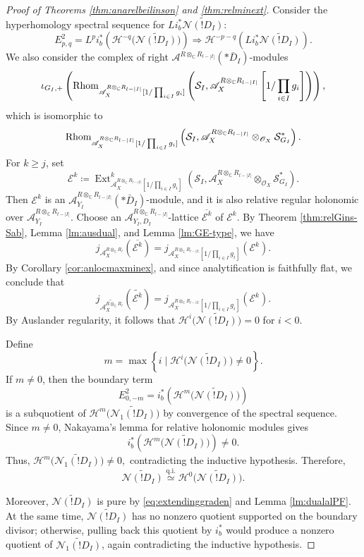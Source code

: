\documentclass{amsart}
\theoremstyle{plain}
\numberwithin{theorem}{section}
\theoremstyle{definition}
\theoremstyle{remark}
\theoremstyle{definition}
\newcommand{\wt}{\widetilde}
\newcommand{\C}{\mathbb{C}} %
\newcommand{\cE}{\mathcal{E}}
\newcommand{\cH}{\mathcal{H}}
\newcommand{\cN}{\mathcal{N}}
\newcommand{\cO}{\mathscr{O}}
\newcommand{\cS}{\mathcal{S}}
\newcommand{\sA}{\mathscr{A}}
\newcommand{\Rhom}{\textup{Rhom}}
\begin{document}
\begin{proof}[Proof of Theorems \ref{thm:anarelbeilinson} and \ref{thm:relminext}]
Consider the hyperhomology spectral sequence for $Li_b^*\wt{\cN(!D_I)}$:
\[
E^2_{p,q}
=
L^p i_b^*
\left(
\cH^{-q}\big(\wt{\cN(!D_I)}\big)
\right)
\Longrightarrow
\cH^{-p-q}
\left(
Li_b^*\wt{\cN(!D_I)}
\right).
\]
We also consider the complex of right
$\sA^{R\otimes_\C R_{l-|I|}}(*\bar D_I)$-modules
\[
\iota_{G_I,+}
\left(
\Rhom_{\sA_X^{R\otimes_\C R_{l-|I|}}
[1/\prod_{i\in I}g_i]}
\left(
\cS_I,
\sA_X^{R\otimes_\C R_{l-|I|}}
\left[1/\prod_{i\in I}g_i\right]
\right)
\right),
\]
which is isomorphic to
\[
\Rhom_{\sA_X^{R\otimes_\C R_{l-|I|}}
[1/\prod_{i\in I}g_i]}
\left(
\cS_I,
\sA_X^{R\otimes_\C R_{l-|I|}}\otimes_{\cO_X}\cS_{G_I}^*
\right).
\]
For $k\ge j$, set
\[
\cE^k
\coloneqq
\operatorname{Ext}^k_{\sA_X^{R\otimes_\C R_{l-|I|}}
[1/\prod_{i\in I}g_i]}
\left(
\cS_I,
\sA_X^{R\otimes_\C R_{l-|I|}}\otimes_{\cO_X}\cS_{G_I}^*
\right).
\]
Then $\cE^k$ is an
$\sA_{Y_I}^{R\otimes_\C R_{l-|I|}}(*\bar D_I)$-module, and it is also
relative regular holonomic over
$\sA_{Y_I}^{R\otimes_\C R_{l-|I|}}$. Choose an
$\sA_{Y_I,D_I}^{R\otimes_\C R_{l-|I|}}$-lattice
$\overline{\cE^k}$ of $\cE^k$. By Theorem \ref{thm:relGins-Sab},
Lemma \ref{lm:ausdual}, and Lemma \ref{lm:GE-type}, we have
\[
j_{\sA_X^{R\otimes_\C R_l}}(\overline{\cE^k})
=
j_{\sA_X^{R\otimes_\C R_{l-|I|}}
[1/\prod_{i\in I}g_i]}(\cE^k).
\]
By Corollary \ref{cor:anlocmaxminex}, and since analytification is faithfully
flat, we conclude that
\begin{equation}\label{eq:extendinggraden}
j_{\wt{\sA_X^{R\otimes_\C R_l}}}(\wt{\cE^k})
=
j_{\sA_X^{R\otimes_\C R_{l-|I|}}
[1/\prod_{i\in I}g_i]}(\cE^k).
\end{equation}
By Auslander regularity, it follows that
$\cH^i\big(\wt{\cN(!D_I)}\big)=0$
for $i<0$.

Define
\[
m=\max\left\{
i\mid
\cH^i\big(\wt{\cN(!D_I)}\big)\neq 0
\right\}.
\]
If $m\neq 0$, then the boundary term
\[
E^2_{0,-m}
=
i_b^*
\left(
\cH^m\big(\wt{\cN(!D_I)}\big)
\right)
\]
is a subquotient of
$\cH^m\big(\wt{\cN_1(!D_I)}\big)$
by convergence of the spectral sequence. Since $m\neq 0$, Nakayama's lemma
for relative holonomic modules \cite[Prop. 1.9(2)]{FS17} gives
\[
i_b^*
\left(
\cH^m\big(\wt{\cN(!D_I)}\big)
\right)
\neq 0.
\]
Thus, 
$\cH^m\big(\wt{\cN_1(!D_I)}\big)\neq 0,$
contradicting the inductive hypothesis. Therefore,
\[
\wt{\cN(!D_I)}
\stackrel{\mathrm{q.i.}}{\simeq}
\cH^0\big(\wt{\cN(!D_I)}\big).
\]

Moreover, $\wt{\cN(!D_I)}$ is pure by \eqref{eq:extendinggraden} and
Lemma \ref{lm:dualalPF}. At the same time, $\wt{\cN(!D_I)}$ has no nonzero
quotient supported on the boundary divisor; otherwise, pulling back this
quotient by $i_b^*$ would produce a nonzero quotient of
$\wt{\cN_1(!D_I)}$, again contradicting the inductive hypothesis.


\end{proof}
\end{document}
